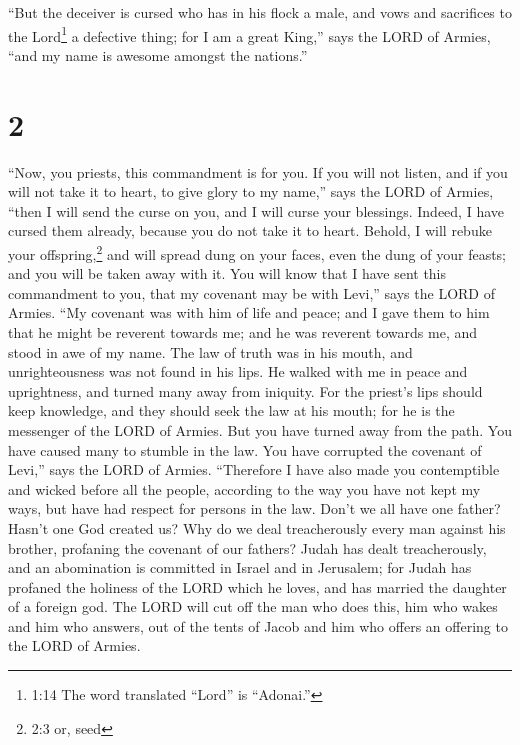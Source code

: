  ``But the deceiver is cursed who has in his flock a male,
and vows and sacrifices to the Lord\footnote{1:14 The word translated
  ``Lord'' is ``Adonai.''} a defective thing; for I am a great King,''
says the LORD of Armies, ``and my name is awesome amongst the nations.''

\hypertarget{section-1}{%
\section{2}\label{section-1}}

 ``Now, you priests, this commandment is for you.
 If you will not listen, and if you will not take it to
heart, to give glory to my name,'' says the LORD of Armies, ``then I
will send the curse on you, and I will curse your blessings. Indeed, I
have cursed them already, because you do not take it to heart.
 Behold, I will rebuke your offspring,\footnote{2:3 or, seed}
and will spread dung on your faces, even the dung of your feasts; and
you will be taken away with it.  You will know that I have
sent this commandment to you, that my covenant may be with Levi,'' says
the LORD of Armies.  ``My covenant was with him of life and
peace; and I gave them to him that he might be reverent towards me; and
he was reverent towards me, and stood in awe of my name. 
The law of truth was in his mouth, and unrighteousness was not found in
his lips. He walked with me in peace and uprightness, and turned many
away from iniquity.  For the priest's lips should keep
knowledge, and they should seek the law at his mouth; for he is the
messenger of the LORD of Armies.  But you have turned away
from the path. You have caused many to stumble in the law. You have
corrupted the covenant of Levi,'' says the LORD of Armies. 
``Therefore I have also made you contemptible and wicked before all the
people, according to the way you have not kept my ways, but have had
respect for persons in the law.  Don't we all have one
father? Hasn't one God created us? Why do we deal treacherously every
man against his brother, profaning the covenant of our fathers?
 Judah has dealt treacherously, and an abomination is
committed in Israel and in Jerusalem; for Judah has profaned the
holiness of the LORD which he loves, and has married the daughter of a
foreign god.  The LORD will cut off the man who does this,
him who wakes and him who answers, out of the tents of Jacob and him who
offers an offering to the LORD of Armies.

